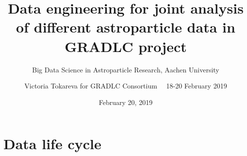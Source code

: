 \documentclass[18pt]{beamer}
\title[Data engineering for astroparticle physics]{Data engineering for joint analysis of different astroparticle data in GRADLC project}
\subtitle{Big Data Science in Astroparticle Research, Aachen University}
\author[Victoria Tokareva]{
  Victoria Tokareva for GRADLC Consortium ~\textbar~18-20 February 2019
}
\institute{Institute for Nuclear Physics (IKP)}
\date{February 20, 2019}
\begin{document}



\section{Data life cycle}








\end{document}
